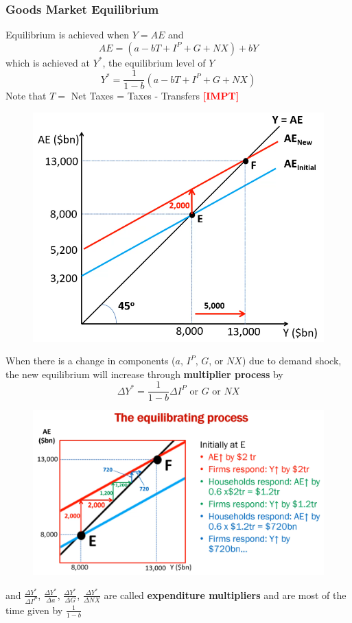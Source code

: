 \documentclass{article}
\newcommand{\impt}[0]{\textcolor{red}{\textbf{[IMPT] }}}
\begin{document}
\begin{multicols}{2}
\subsubsection{Goods Market Equilibrium}
Equilibrium is achieved when $Y = AE$ and
$$AE = (a-bT + I^P + G + NX) + bY$$
which is achieved at $Y^*$, the equilibrium level of $Y$
$$Y^* = \frac{1}{1-b}(a-bT + I^P + G + NX)$$
Note that $T=$ Net Taxes = Taxes - Transfers \impt
\begin{figure}[H]
	\centering
	\includegraphics[width=\columnwidth]{images/keynesian.png}
\end{figure}
When there is a change in components ($a$, $I^P$, $G$, or $NX$) due to demand shock, the new equilibrium will increase through \textbf{multiplier process} by
$$\Delta Y^* = \frac{1}{1-b}\Delta I^P \text{ or } G \text{ or } NX$$
\begin{figure}[H]
	\centering
	\includegraphics[width=\columnwidth]{images/keynesian_eq.png}
\end{figure}
and $\frac{\Delta Y^*}{\Delta I^P}$, $\frac{\Delta Y^*}{\Delta a}$, $\frac{\Delta Y^*}{\Delta G}$, $\frac{\Delta Y^*}{\Delta NX}$ are called \textbf{expenditure multipliers} and are most of the time given by $\frac{1}{1-b}$

\end{multicols}
\end{document}
